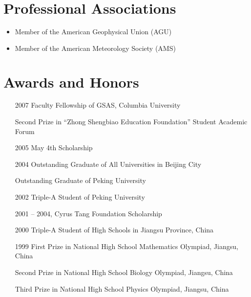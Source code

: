 \documentclass[11pt]{article}
\begin{document}
\section{Professional Associations}
\begin{itemize}[leftmargin=4ex]
	\item Member of the American Geophysical Union (AGU) 
	\item Member of the American Meteorology Society (AMS)
\end{itemize}


\section{Awards and Honors}
\begin{itemize}[leftmargin=10ex, itemsep=0ex]
	\item[2007] Faculty Fellowship of GSAS, Columbia University
	
	\item[\phantom{2007}] Second Prize in ``Zhong Shengbiao Education Foundation'' Student  Academic Forum 
	
	\item[2005] May 4th Scholarship	
	
	\item[2004] Outstanding Graduate of All Universities in Beijing City
	
	\item[\phantom{2004}] Outstanding Graduate of Peking University
	
	\item[2002] Triple-A Student of Peking University
	
	\item[2001]-- 2004, Cyrus Tang Foundation Scholarship
		
	\item[2000] Triple-A Student of High Schools in Jiangsu Province,  China
	
	\item[1999] First Prize in National High School Mathematics Olympiad, Jiangsu, China

	\item[\phantom{1999}] Second Prize in National High School Biology Olympiad, Jiangsu, China

	\item[\phantom{1999}] Third Prize in National High School Physics Olympiad, Jiangsu, China
\end{itemize}
\end{document}
